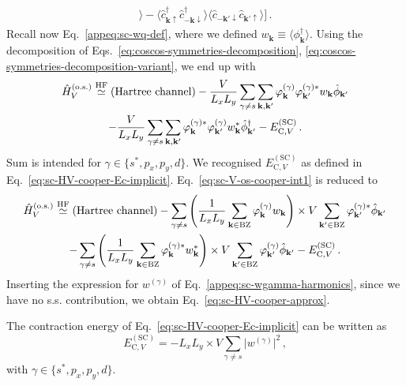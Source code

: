 \begin{tabproof}
\begin{multline*}
		\big\rangle
		-
		\big\langle
		\hat c_{\mathbf{k} \uparrow}^\dagger \hat c_{-\mathbf{k} \downarrow}^\dagger
		\big\rangle
		\big\langle 
		\hat c_{-\mathbf{k}' \downarrow} \hat c_{\mathbf{k}'\uparrow}
		\big\rangle
		\Big] \, .
	\end{multline*}
	Recall now Eq.~\eqref{appeq:sc-wq-def}, where we defined $w_\mathbf{k} \equiv \big\langle \phi_\mathbf{k}^\dagger \big\rangle$. Using the decomposition of Eqs.~\eqref{eq:coscos-symmetries-decomposition}, \eqref{eq:coscos-symmetries-decomposition-variant}, we end up with
	\begin{multline} \label{eq:sc-V-os-cooper-int1}
		\hat H_V^{(\mathrm{o.s.})} \stackrel{\mathrm{HF}}{\simeq} \text{(Hartree channel)}
		- \frac{V}{L_x L_y} \sum_{\gamma\neq s} \sum_{\mathbf{k}, \mathbf{k}'} \varphi_\mathbf{k}^{(\gamma)} \varphi_{\mathbf{k}'}^{(\gamma)*}
		w_\mathbf{k} \hat \phi_{\mathbf{k}'} \\
		- \frac{V}{L_x L_y} \sum_{\gamma\neq s} \sum_{\mathbf{k}, \mathbf{k}'} \varphi_\mathbf{k}^{(\gamma)*} \varphi_{\mathbf{k}'}^{(\gamma)} w_\mathbf{k}^* \hat \phi_{\mathbf{k}'}^\dagger	- E_{\mathrm{C},V}^{(\mathrm{SC})} \, .
	\end{multline}
	Sum is intended for $\gamma \in \lbrace s^*, p_x, p_y, d \rbrace$. We recognised $E_{\mathrm{C},V}^{(\mathrm{SC})}$ as defined in Eq.~\eqref{eq:sc-HV-cooper-Ec-implicit}.  Eq.~\eqref{eq:sc-V-os-cooper-int1} is reduced to
	\begin{multline} 
		\hat H_V^{(\mathrm{o.s.})} \stackrel{\mathrm{HF}}{\simeq} \text{(Hartree channel)}
		-\sum_{\gamma\neq s}
		\left(
		\frac{1}{L_x L_y} \sum_{\mathbf{k}\in\mathrm{BZ}} \varphi_\mathbf{k}^{(\gamma)} w_\mathbf{k}
		\right) \times V \sum_{\mathbf{k}'\in\mathrm{BZ}} \varphi_{\mathbf{k}'}^{(\gamma)*} \hat \phi_{\mathbf{k}'} \\ 
		-\sum_{\gamma\neq s}
		\left(
		\frac{1}{L_x L_y} \sum_{\mathbf{k}\in\mathrm{BZ}} \varphi_\mathbf{k}^{(\gamma)*} w_\mathbf{k}^*
		\right) \times V \sum_{\mathbf{k}'\in\mathrm{BZ}} \varphi_{\mathbf{k}'}^{(\gamma)} \hat \phi_{\mathbf{k}'}
		- E_{\mathrm{C},V}^{(\mathrm{SC})} \, .
	\end{multline}
	Inserting the expression for $w^{(\gamma)}$ of Eq.~\eqref{appeq:sc-wgamma-harmonics}, since we have no s.s. contribution, we obtain Eq.~\eqref{eq:sc-HV-cooper-approx}.
\end{tabproof}

The contraction energy of Eq.~\eqref{eq:sc-HV-cooper-Ec-implicit} can be written as
\begin{equation}\label{eq:sc-HV-cooper-Ec}
	E_{\mathrm{C},V}^{(\mathrm{SC})} = - L_x L_y \times V \sum_{\gamma\neq s} \big| w^{(\gamma)} \big|^2 \, ,
\end{equation}
with $\gamma \in \lbrace s^*, p_x, p_y, d \rbrace$.

